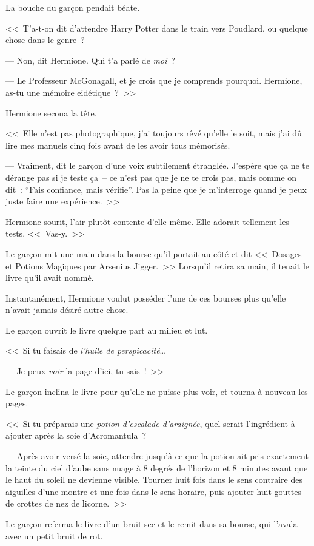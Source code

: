 La bouche du garçon pendait béate.

<<~T'a-t-on dit d'attendre Harry Potter dans le train vers Poudlard, ou quelque chose dans le genre~?

--- Non, dit Hermione. Qui t'a parlé de \emph{moi}~?

--- Le Professeur McGonagall, et je crois que je comprends pourquoi. Hermione, as-tu une mémoire eidétique~?~>>

Hermione secoua la tête.

<<~Elle n'est pas photographique, j'ai toujours rêvé qu'elle le soit, mais j'ai dû lire mes manuels cinq fois avant de les avoir tous mémorisés.

--- Vraiment, dit le garçon d'une voix subtilement étranglée. J'espère que ça ne te dérange pas si je teste ça~-- ce n'est pas que je ne te crois pas, mais comme on dit~: “Fais confiance, mais vérifie”. Pas la peine que je m'interroge quand je peux juste faire une expérience.~>>

Hermione sourit, l'air plutôt contente d'elle-même. Elle adorait tellement les tests. <<~Vas-y.~>>

Le garçon mit une main dans la bourse qu'il portait au côté et dit <<~Dosages et Potions Magiques par Arsenius Jigger.~>> Lorsqu'il retira sa main, il tenait le livre qu'il avait nommé.

Instantanément, Hermione voulut posséder l'une de ces bourses plus qu'elle n'avait jamais désiré autre chose.

Le garçon ouvrit le livre quelque part au milieu et lut.

<<~Si tu faisais de \emph{l'huile de perspicacité}…

--- Je peux \emph{voir} la page d'ici, tu sais~!~>>

Le garçon inclina le livre pour qu'elle ne puisse plus voir, et tourna à nouveau les pages.

<<~Si tu préparais une \emph{potion d'escalade d'araignée}, quel serait l'ingrédient à ajouter après la soie d'Acromantula~?

--- Après avoir versé la soie, attendre jusqu'à ce que la potion ait pris exactement la teinte du ciel d'aube sans nuage à 8 degrés de l'horizon et 8 minutes avant que le haut du soleil ne devienne visible. Tourner huit fois dans le sens contraire des aiguilles d'une montre et une fois dans le sens horaire, puis ajouter huit gouttes de crottes de nez de licorne.~>>

Le garçon referma le livre d'un bruit sec et le remit dans sa bourse, qui l'avala avec un petit bruit de rot.

